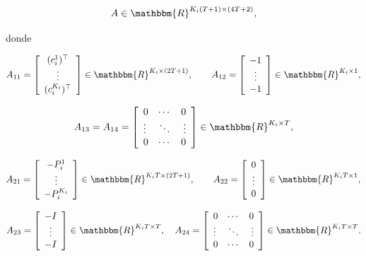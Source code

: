 \documentclass[a4paper,12pt]{report}
\newcommand{\RR}{\mathbbm{R}}
\begin{document}
$$A\in \RR^{K_i(T+1)\times(4T+2)},$$

donde

$$A_{11}=\left[
\begin{array}{c}
(c_i^1)^\top\\
 \vdots\\
(c_i^{K_i})^\top\\
\end{array}
\right]\in\RR^{K_i\times(2T+1)},
\qquad
A_{12}=\left[
\begin{array}{c}
-1\\
 \vdots\\
-1\\
\end{array}
\right]\in\RR^{K_i\times1},$$

$$A_{13}=A_{14}=\left[
\begin{array}{lcr}
0&\cdots &0\\
\vdots& \ddots &\vdots\\
0&\cdots & 0\\
\end{array}
\right]\in\RR^{K_i\times T},$$


$$A_{21}=\left[
\begin{array}{c}
-P_i^1\\
 \vdots\\
-P_i^{K_i}\\
\end{array}
\right]\in\RR^{K_i T\times (2T+1)},
\qquad
A_{22}=\left[
\begin{array}{c}
0\\
 \vdots\\
0\\
\end{array}
\right]\in\RR^{K_i T\times 1},$$

$$A_{23}=\left[
\begin{array}{c}
-I\\
 \vdots\\
-I\\
\end{array}
\right]\in\RR^{K_i T\times T},
\quad
A_{24}=\left[
\begin{array}{lcr}
0&\cdots &0\\
\vdots& \ddots &\vdots\\
0&\cdots & 0\\
\end{array}
\right]\in\RR^{K_iT\times T}.$$


\end{document}
